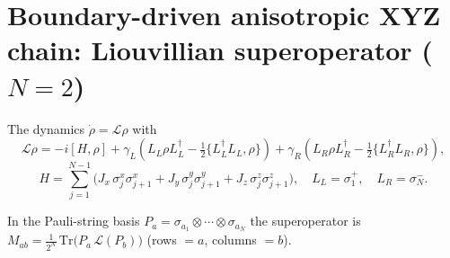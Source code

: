 \documentclass[11pt]{article}
\begin{document}
\section*{Boundary-driven anisotropic XYZ chain: Liouvillian superoperator ($N=2$)}

The dynamics $\dot\rho = \mathcal{L}\rho$ with
\[ \mathcal{L}\rho = -i[H,\rho] + \gamma_L\!\left(L_L\rho L_L^\dagger - \tfrac12\{L_L^\dagger L_L,\rho\}\right) + \gamma_R\!\left(L_R\rho L_R^\dagger - \tfrac12\{L_R^\dagger L_R,\rho\}\right), \]
\[ H = \sum_{j=1}^{N-1} \big(J_x\,\sigma^x_j\sigma^x_{j+1} + J_y\,\sigma^y_j\sigma^y_{j+1} + J_z\,\sigma^z_j\sigma^z_{j+1}\big), \quad L_L = \sigma^+_1,\quad L_R = \sigma^-_N. \]

In the Pauli-string basis $P_a = \sigma_{a_1}\!\otimes\cdots\otimes\sigma_{a_N}$ the superoperator is
$M_{ab} = \tfrac{1}{2^N}\,\mathrm{Tr}\!\big(P_a\,\mathcal{L}(P_b)\big)$ (rows $=a$, columns $=b$).
\end{document}
